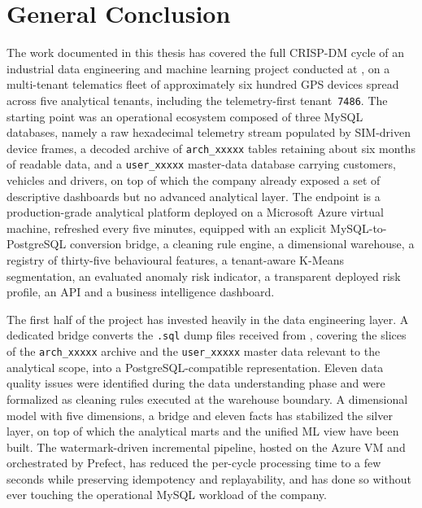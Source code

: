 \chapter*{General Conclusion}

The work documented in this thesis has covered the full CRISP-DM cycle of an industrial data engineering and machine learning project conducted at \hostorg, on a multi-tenant telematics fleet of approximately six hundred GPS devices spread across five analytical tenants, including the telemetry-first tenant~\texttt{7486}. The starting point was an operational ecosystem composed of three MySQL databases, namely a raw hexadecimal telemetry stream populated by SIM-driven device frames, a decoded archive of \texttt{arch\_xxxxx} tables retaining about six months of readable data, and a \texttt{user\_xxxxx} master-data database carrying customers, vehicles and drivers, on top of which the company already exposed a set of descriptive dashboards but no advanced analytical layer. The endpoint is a production-grade analytical platform deployed on a Microsoft Azure virtual machine, refreshed every five minutes, equipped with an explicit MySQL-to-PostgreSQL conversion bridge, a cleaning rule engine, a dimensional warehouse, a registry of thirty-five behavioural features, a tenant-aware K-Means segmentation, an evaluated anomaly risk indicator, a transparent deployed risk profile, an API and a business intelligence dashboard.

The first half of the project has invested heavily in the data engineering layer. A dedicated bridge converts the \texttt{.sql} dump files received from \hostorg{}, covering the slices of the \texttt{arch\_xxxxx} archive and the \texttt{user\_xxxxx} master data relevant to the analytical scope, into a PostgreSQL-compatible representation. Eleven data quality issues were identified during the data understanding phase and were formalized as cleaning rules executed at the warehouse boundary. A dimensional model with five dimensions, a bridge and eleven facts has stabilized the silver layer, on top of which the analytical marts and the unified ML view have been built. The watermark-driven incremental pipeline, hosted on the Azure VM and orchestrated by Prefect, has reduced the per-cycle processing time to a few seconds while preserving idempotency and replayability, and has done so without ever touching the operational MySQL workload of the company.


